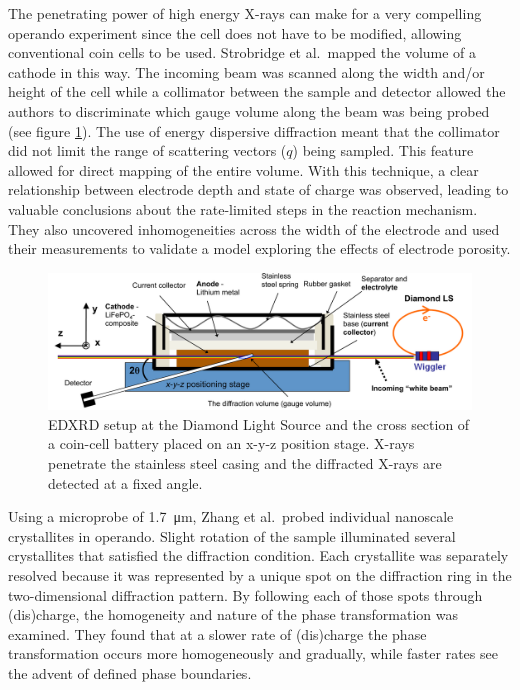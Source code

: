 \documentclass[journal=cmatex,manuscript=perspective]{achemso}
\begin{document}
The penetrating power of high energy X-rays can make for a very
compelling operando experiment since the cell does not have to be
modified, allowing conventional coin cells to be used. Strobridge et
al.\ mapped the volume of a  cathode in this
way\cite{strobridge2015}. The incoming beam was scanned along the
width and/or height of the cell while a collimator between the sample
and detector allowed the authors to discriminate which gauge volume
along the beam was being probed (see figure
\ref{figure:strobridge2015}). The use of energy dispersive diffraction
meant that the collimator did not limit the range of scattering
vectors ($q$) being sampled. This feature allowed for direct mapping
of the entire volume. With this technique, a clear relationship
between electrode depth and state of charge was observed, leading to
valuable conclusions about the rate-limited steps in the reaction
mechanism. They also uncovered inhomogeneities across the width of the
electrode and used their measurements to validate a model exploring
the effects of electrode porosity.

\begin{figure}
  \includegraphics[width=\textwidth]{strobridge2015.png}
  \caption{ EDXRD setup at the Diamond Light Source and the
    cross section of a coin-cell battery placed on an x-y-z position
    stage. X-rays penetrate the stainless steel casing and the
    diffracted X-rays are detected at a fixed angle.\cite{strobridge2015}}
  \label{figure:strobridge2015}
\end{figure}

Using a microprobe of \SI{1.7}{\micro\meter}, Zhang et al.\ probed
individual nanoscale  crystallites in operando. Slight
rotation of the sample illuminated several crystallites that satisfied
the diffraction condition. Each crystallite was separately resolved
because it was represented by a unique spot on the diffraction ring in
the two-dimensional diffraction pattern. By following each of those
spots through (dis)charge, the homogeneity and nature of the phase
transformation was examined. They found that at a slower rate of
(dis)charge the phase transformation occurs more homogeneously and
gradually, while faster rates see the advent of defined phase
boundaries\cite{zhang2015-2}.
\end{document}
